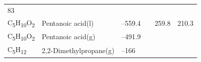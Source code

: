 \documentclass[
  9pt,
]{extbook}
\theoremstyle{definition}
\theoremstyle{definition}
\theoremstyle{definition}
\theoremstyle{remark}
\begin{document}
\begin{longtable}[]{@{}llllll@{}}
\begin{minipage}[t]{0.14\columnwidth}
83\strut
\end{minipage}\tabularnewline
\begin{minipage}[t]{0.07\columnwidth}\raggedright
C\textsubscript{5}H\textsubscript{10}O\textsubscript{2}\strut
\end{minipage} & \begin{minipage}[t]{0.17\columnwidth}\raggedright
Pentanoic acid(l)\strut
\end{minipage} & \begin{minipage}[t]{0.15\columnwidth}\raggedright
--559.4\strut
\end{minipage} & \begin{minipage}[t]{0.15\columnwidth}\raggedright
\strut
\end{minipage} & \begin{minipage}[t]{0.14\columnwidth}\raggedright
259.8\strut
\end{minipage} & \begin{minipage}[t]{0.14\columnwidth}\raggedright
210.3\strut
\end{minipage}\tabularnewline
\begin{minipage}[t]{0.07\columnwidth}\raggedright
C\textsubscript{5}H\textsubscript{10}O\textsubscript{2}\strut
\end{minipage} & \begin{minipage}[t]{0.17\columnwidth}\raggedright
Pentanoic acid(g)\strut
\end{minipage} & \begin{minipage}[t]{0.15\columnwidth}\raggedright
--491.9\strut
\end{minipage} & \begin{minipage}[t]{0.15\columnwidth}\raggedright
\strut
\end{minipage} & \begin{minipage}[t]{0.14\columnwidth}\raggedright
\strut
\end{minipage} & \begin{minipage}[t]{0.14\columnwidth}\raggedright
\strut
\end{minipage}\tabularnewline
\begin{minipage}[t]{0.07\columnwidth}\raggedright
C\textsubscript{5}H\textsubscript{12}\strut
\end{minipage} & \begin{minipage}[t]{0.17\columnwidth}\raggedright
2,2-Dimethylpropane(g)\strut
\end{minipage} & \begin{minipage}[t]{0.15\columnwidth}\raggedright
--166\strut
\end{minipage} & \begin{minipage}[t]{0.15\columnwidth}\raggedright

\end{minipage}
\end{longtable}
\end{document}
